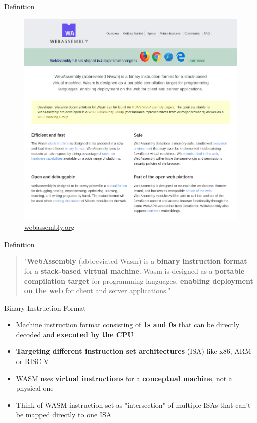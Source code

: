 \documentclass{beamer}
\begin{document}
\begin{frame}{Definition}
    \begin{figure}
        \includegraphics[scale=0.2]{./images/webassembly_org.png}
        \caption{\href{https://webassembly.org/}{webassembly.org}}
    \end{figure}
\end{frame}

\begin{frame}{Definition}
    \begin{quotation}
        "\textbf{WebAssembly} (abbreviated Wasm) is a \textbf{binary instruction format} for a \textbf{stack-based virtual machine}. Wasm is designed as a \textbf{portable compilation target} for programming languages, \textbf{enabling deployment on the web} for client and server applications."
    \end{quotation}
\end{frame}

\begin{frame}{Binary Instruction Format}
    \begin{itemize}
        \item Machine instruction format consisting of \textbf{1s and 0s} that can be directly decoded and \textbf{executed by the CPU}
        \item \textbf{Targeting different instruction set architectures} (ISA) like x86, ARM or RISC-V
        \item WASM uses \textbf{virtual instructions} for a \textbf{conceptual machine}, not a physical one
        \item Think of WASM instruction set as "intersection" of multiple ISAs that can't be mapped directly to one ISA
    \end{itemize}
\end{frame}
\end{document}
